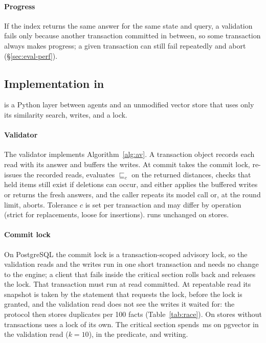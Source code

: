 \documentclass[sigconf, nonacm, review]{acmart}
\begin{document}
\paragraph{Progress}
If the index returns the same answer for the same state and query, a
validation fails only because another transaction committed in
between, so some transaction always makes progress; a given transaction
can still fail repeatedly and abort (\S\ref{sec:eval-perf}).

\subsection{Implementation in \sys{}}
\label{sec:system}

\sys{} is a Python layer between agents and an unmodified vector
store that uses only its similarity search, writes, and a lock.

\paragraph{Validator}
The validator implements Algorithm~\ref{alg:av}. A transaction object
records each read with its answer and buffers the writes. At commit \sys{} takes the commit lock,
re-issues the recorded reads, evaluates $\sqsubseteq_c$ on the returned
distances, checks that held items still exist if deletions can
occur, and either applies the buffered writes or returns the fresh
answers, and the caller repeats its model call or, at the round
limit, aborts. Tolerance $c$
is set per transaction and may differ by operation (strict for
replacements, loose for insertions). \sys{} runs unchanged
on  stores.

\paragraph{Commit lock}
On PostgreSQL the commit lock is a transaction-scoped advisory lock, so
the validation reads and the writes run in one short transaction and
\sys{} needs no change to the engine; a client that fails inside
the critical section rolls back and releases the lock. That transaction
must run at read committed. At repeatable read its snapshot is taken by
the statement that requests the lock, before the lock is granted, and
the validation read does not see the writes it waited for: the
protocol then stores  duplicates per 100 facts
(Table~\ref{tab:race}). On stores without transactions
\sys{} uses a lock of its own. The critical section spends
\,ms on pgvector in the validation read ($k=10$),
 in the predicate, and  writing.
\end{document}

